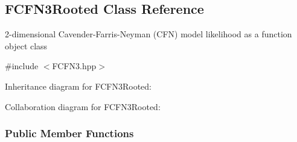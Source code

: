 \hypertarget{classFCFN3Rooted}{\subsection{\-F\-C\-F\-N3\-Rooted \-Class \-Reference}
\label{classFCFN3Rooted}
}


2-\/dimensional \-Cavender-\/\-Farris-\/\-Neyman (\-C\-F\-N) model likelihood as a function object class  




{\ttfamily \#include $<$\-F\-C\-F\-N3.\-hpp$>$}



\-Inheritance diagram for \-F\-C\-F\-N3\-Rooted\-:


\-Collaboration diagram for \-F\-C\-F\-N3\-Rooted\-:
\subsubsection*{\-Public \-Member \-Functions}
